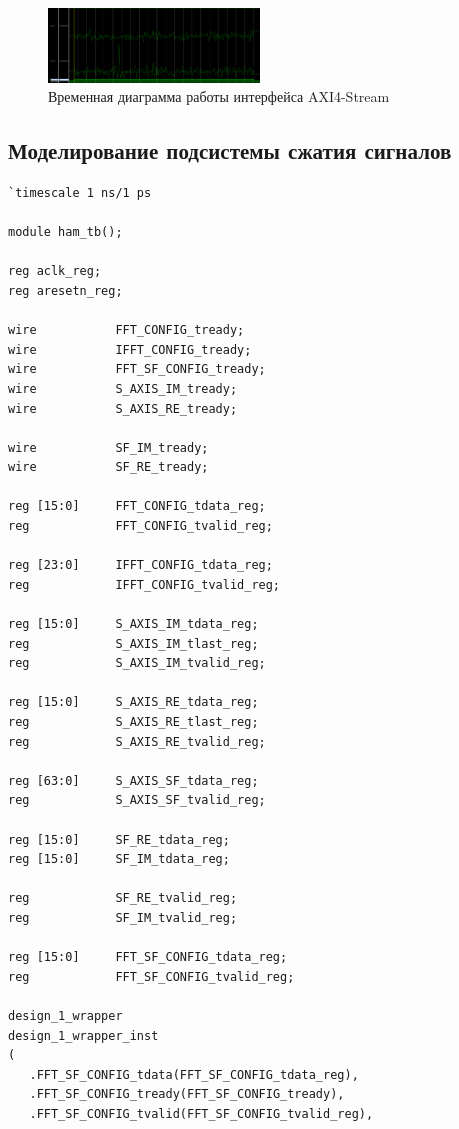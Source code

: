 \begin{figure}[h]
	\centering
	\includegraphics[width=0.5\textwidth]{image/correl_with_noise.png}
	\caption{Временная диаграмма работы интерфейса AXI4-Stream}
	\label{fft_detailed_implem}
\end{figure}

\subsection{Моделирование подсистемы сжатия сигналов}

\begin{Verbatim}[tabsize=4]
`timescale 1 ns/1 ps

module ham_tb();

reg aclk_reg;
reg aresetn_reg;

wire           FFT_CONFIG_tready;
wire           IFFT_CONFIG_tready;
wire           FFT_SF_CONFIG_tready;
wire           S_AXIS_IM_tready;
wire           S_AXIS_RE_tready;

wire           SF_IM_tready;
wire           SF_RE_tready;

reg [15:0]     FFT_CONFIG_tdata_reg;
reg            FFT_CONFIG_tvalid_reg;

reg [23:0]     IFFT_CONFIG_tdata_reg;
reg            IFFT_CONFIG_tvalid_reg;

reg [15:0]     S_AXIS_IM_tdata_reg;
reg            S_AXIS_IM_tlast_reg;
reg            S_AXIS_IM_tvalid_reg;

reg [15:0]     S_AXIS_RE_tdata_reg;
reg            S_AXIS_RE_tlast_reg;
reg            S_AXIS_RE_tvalid_reg;

reg [63:0]     S_AXIS_SF_tdata_reg;
reg            S_AXIS_SF_tvalid_reg;

reg [15:0]     SF_RE_tdata_reg;
reg [15:0]     SF_IM_tdata_reg;

reg            SF_RE_tvalid_reg;
reg            SF_IM_tvalid_reg;

reg [15:0]     FFT_SF_CONFIG_tdata_reg;
reg            FFT_SF_CONFIG_tvalid_reg;

design_1_wrapper
design_1_wrapper_inst
(
   .FFT_SF_CONFIG_tdata(FFT_SF_CONFIG_tdata_reg),
   .FFT_SF_CONFIG_tready(FFT_SF_CONFIG_tready),
   .FFT_SF_CONFIG_tvalid(FFT_SF_CONFIG_tvalid_reg),


\end{Verbatim}
